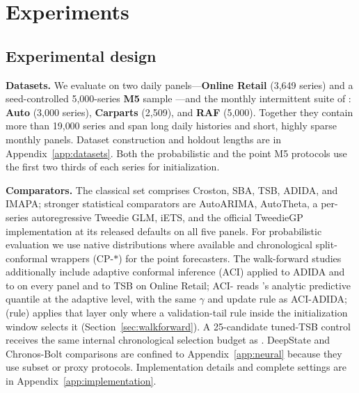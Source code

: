 
\section{Experiments}\label{sec:experiments}

\subsection{Experimental design}\label{sec:setup}

\textbf{Datasets.} We evaluate on two daily panels---\textbf{Online
Retail} \citep{chen2015} (3{,}649 series) and a seed-controlled
5{,}000-series \textbf{M5} sample \citep{makridakis2022}---and the
monthly intermittent suite of \citet{damato2025}: \textbf{Auto}
(3{,}000 series), \textbf{Carparts} (2{,}509), and \textbf{RAF}
(5{,}000). Together they contain more than 19{,}000 series and span
long daily histories and short, highly sparse monthly panels. Dataset
construction and holdout lengths are in Appendix~\ref{app:datasets}.
Both the probabilistic and the point M5 protocols use the first two
thirds of each series for initialization.

\textbf{Comparators.} The classical set comprises Croston, SBA, TSB,
ADIDA, and IMAPA; stronger statistical comparators are AutoARIMA,
AutoTheta, a per-series autoregressive Tweedie GLM, iETS, and the official
TweedieGP implementation at its released defaults on all five panels.
For probabilistic
evaluation we use native distributions where available and chronological
split-conformal wrappers (CP-$\ast$) for the point forecasters. The
walk-forward studies additionally include adaptive conformal inference
(ACI) applied to ADIDA and to \EBB{} on every panel and to TSB on Online
Retail; ACI-\EBB{} reads \EBB{}'s analytic predictive quantile at the
adaptive level, with the same $\gamma$ and update rule as ACI-ADIDA;
\EBB{} (rule) applies that layer only where a validation-tail rule inside
the initialization window selects it (Section~\ref{sec:walkforward}). A 25-candidate tuned-TSB control
receives the same internal chronological selection budget as \EBB{}.
DeepState and Chronos-Bolt comparisons are confined to
Appendix~\ref{app:neural} because they use subset or proxy protocols.
Implementation details and complete settings are in
Appendix~\ref{app:implementation}.

